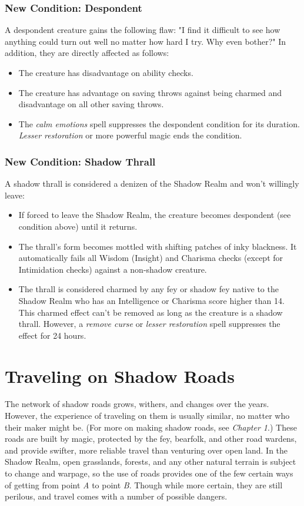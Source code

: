 \documentclass[10pt,a4paper,twoside,bg=print,twocolumn,openany,nodeprecatedcode]{dndbook}
\begin{document}
\subsubsection{New Condition: Despondent}
A despondent creature gains the following flaw: "I find it difficult to see how anything could turn out well no matter how hard I try. Why even bother?" In addition, they are directly affected as follows:


\begin{itemize}
\item The creature has disadvantage on ability checks.
\item The creature has advantage on saving throws against being charmed and disadvantage on all other saving throws.
\item The \textit{calm emotions} spell suppresses the despondent condition for its duration. \textit{Lesser restoration} or more powerful magic ends the condition.
\end{itemize}

\subsubsection{New Condition: Shadow Thrall}
A shadow thrall is considered a denizen of the Shadow Realm and won't willingly leave:


\begin{itemize}
\item If forced to leave the Shadow Realm, the creature becomes despondent (see condition above) until it returns.
\item The thrall's form becomes mottled with shifting patches of inky blackness. It automatically fails all Wisdom (Insight) and Charisma checks (except for Intimidation checks) against a non-shadow creature.
\item The thrall is considered charmed by any fey or shadow fey native to the Shadow Realm who has an Intelligence or Charisma score higher than 14. This charmed effect can't be removed as long as the creature is a shadow thrall. However, a \textit{remove curse} or \textit{lesser restoration} spell suppresses the effect for 24 hours.
\end{itemize}

\section{Traveling on Shadow Roads}
The network of shadow roads grows, withers, and changes over the years. However, the experience of traveling on them is usually similar, no matter who their maker might be. (For more on making shadow roads, see \textit{Chapter 1}.) These roads are built by magic, protected by the fey, bearfolk, and other road wardens, and provide swifter, more reliable travel than venturing over open land. In the Shadow Realm, open grasslands, forests, and any other natural terrain is subject to change and warpage, so the use of roads provides one of the few certain ways of getting from point \textit{A} to point \textit{B}. Though while more certain, they are still perilous, and travel comes with a number of possible dangers.
\end{document}
